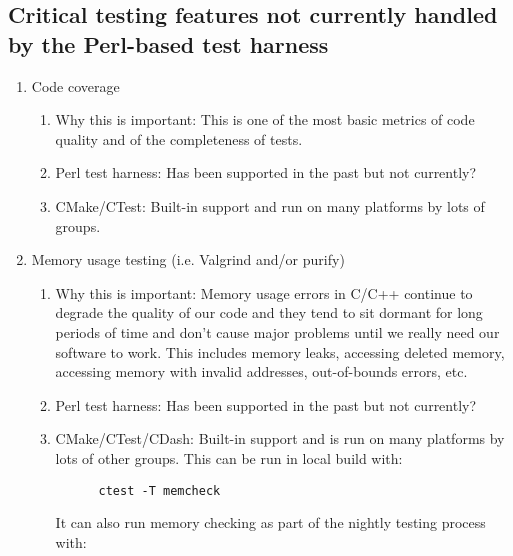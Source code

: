\documentclass[pdf,ps2pdf,11pt]{SANDreport}
\begin{document}
%
{}\subsection{Critical testing features not currently handled by the
Perl-based test harness}
%

\begin{enumerate}

{}\item Code coverage

  \begin{enumerate}

  {}\item Why this is important: This is one of the most basic
  metrics of code quality and of the completeness of tests.

  {}\item Perl test harness: Has been supported in the past but not
  currently?

  {}\item CMake/CTest: Built-in support and run on many platforms by
  lots of groups.

  \end{enumerate}

{}\item Memory usage testing (i.e. Valgrind and/or purify)

  \begin{enumerate}

  {}\item Why this is important: Memory usage errors in C/C++
  continue to degrade the quality of our code and they tend to sit
  dormant for long periods of time and don't cause major problems
  until we really need our software to work.  This includes memory
  leaks, accessing deleted memory, accessing memory with invalid
  addresses, out-of-bounds errors, etc.

  {}\item Perl test harness: Has been supported in the past but not
  currently?

  {}\item CMake/CTest/CDash: Built-in support and is run on many
  platforms by lots of other groups.  This can be run in local build
  with:

    \begin{verbatim}
      ctest -T memcheck
    \end{verbatim}

  It can also run memory checking as part of the nightly testing
  process with:


\end{enumerate}
\end{enumerate}
\end{document}
